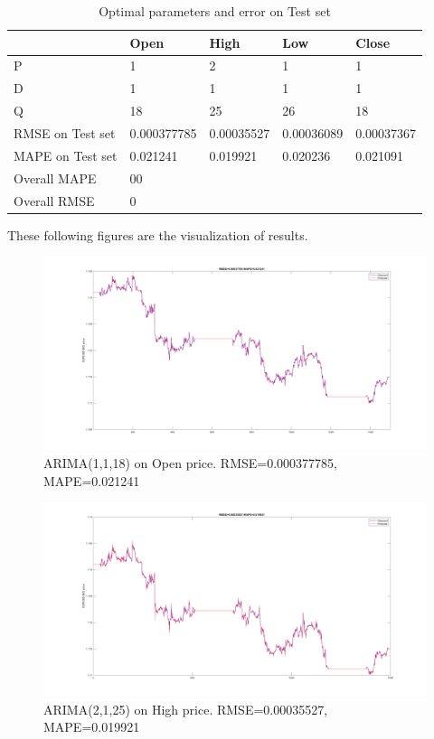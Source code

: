 \documentclass[11pt]{article}
\begin{document}
\begin{table}[H]
\begin{tabular}{|l|l|l|l|l|}
  \hline
  & Open        & High       & Low        & Close      \\ \hline
  P                & 1           & 2          & 1          & 1          \\ \hline
  D                & 1           & 1          & 1          & 1          \\ \hline
  Q                & 18          & 25         & 26         & 18         \\ \hline
  RMSE on Test set & 0.000377785 & 0.00035527 & 0.00036089 & 0.00037367 \\ \hline
  MAPE on Test set & 0.021241    & 0.019921   & 0.020236   & 0.021091   \\ \hline
  Overall MAPE     & 00                                                 \\ \hline
  Overall RMSE     & 0                                                  \\ \hline
\end{tabular}
\caption{Optimal parameters and error on Test set}
\end{table}
These following figures are the visualization of results.
\begin{figure}[H]
  \centering
  \includegraphics[width=\textwidth,keepaspectratio]{figs/arima_1_1_18_open.png}
  \caption{ARIMA(1,1,18) on Open price. RMSE=0.000377785, MAPE=0.021241}
\end{figure}

\begin{figure}[H]
  \centering
  \includegraphics[width=\linewidth,keepaspectratio]{figs/arima_2_1_25_high.png}
  \caption{ARIMA(2,1,25) on High price. RMSE=0.00035527, MAPE=0.019921}
\end{figure}
\end{document}
